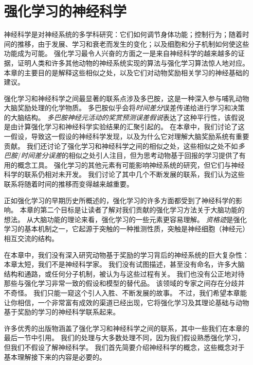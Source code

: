 \chapter{强化学习的神经科学} \label{chap:chap12}


神经科学是对神经系统的多学科研究：它们如何调节身体功能；控制行为；随着时间的推移，由于发展、学习和衰老而发生的变化；以及细胞和分子机制如何使这些功能成为可能。
强化学习最令人兴奋的方面之一是来自神经科学的越来越多的证据，证明人类和许多其他动物的神经系统实现的算法与强化学习算法惊人地对应。
本章的主要目的是解释这些相似之处，以及它们对动物奖励相关学习的神经基础的建议。


强化学习和神经科学之间最显著的联系点涉及多巴胺，这是一种深入参与哺乳动物大脑奖励处理的化学物质。
多巴胺似乎会将\textit{时间差分}误差传递给进行学习和决策的大脑结构。
\textit{多巴胺神经元活动的奖赏预测误差假说}表达了这种平行性，该假说是由计算强化学习和神经科学实验结果的汇聚引起的。
在本章中，我们讨论了这一假设，导致这一假设的神经科学发现，以及为什么它对理解大脑奖励系统有重要贡献。
我们还讨论了强化学习和神经科学之间的相似之处，这些相似之处不如\textit{多巴胺}/\textit{时间差分误差}的相似之处引人注目，但为思考动物基于回报的学习提供了有用的概念工具。
强化学习的其他元素有可能影响神经系统的研究，但它们与神经科学的联系仍相对未开发。
我们讨论了其中几个不断发展的联系，我们认为这些联系将随着时间的推移而变得越来越重要。


正如强化学习的早期历史所概述的，强化学习的许多方面都受到了神经科学的影响。
本章的第二个目标是让读者了解对我们贡献的强化学习方法关于大脑功能的想法。
从大脑功能的理论来看，强化学习的一些元素更容易理解。
\textit{资格迹}是强化学习的基本机制之一，它起源于突触的一种推测性质，突触是神经细胞（神经元）相互交流的结构。


在本章中，我们没有深入研究动物基于奖励的学习背后的神经系统的巨大复杂性：本章太短，我们不是神经科学家。
我们没有试图描述，甚至没有命名，许多大脑结构和通路，或任何分子机制，被认为与这些过程有关。
我们也没有公正地对待那些与强化学习非常一致的假设和模型的替代品。
该领域的专家之间存在分歧并不奇怪。
我们只能一窥这个引人入胜、不断发展的故事。
不过，我们希望本章能让你相信，一个非常富有成效的渠道已经出现，它将强化学习及其理论基础与动物基于奖励的学习的神经科学联系起来。


许多优秀的出版物涵盖了强化学习和神经科学之间的联系，其中一些我们在本章的最后一节中引用。
我们的处理与大多数处理不同，因为我们假设熟悉强化学习，但我们不假设了解神经科学。
我们首先简要介绍神经科学的概念，这些概念对于基本理解接下来的内容是必要的。



